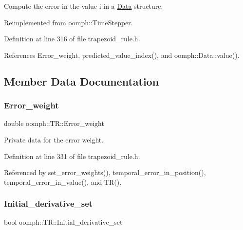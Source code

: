 Compute the error in the value i in a \hyperlink{classoomph_1_1Data}{Data} structure. 



Reimplemented from \hyperlink{classoomph_1_1TimeStepper_a27f66759f6d9b2040d26918adb998c78}{oomph\+::\+Time\+Stepper}.



Definition at line 316 of file trapezoid\+\_\+rule.\+h.



References Error\+\_\+weight, predicted\+\_\+value\+\_\+index(), and oomph\+::\+Data\+::value().



\subsection{Member Data Documentation}
\mbox{\label{classoomph_1_1TR_a5dbcb466fcff21c9780c0cf1b8971bc4}} 
\subsubsection{\texorpdfstring{Error\+\_\+weight}{Error\_weight}}
{\footnotesize\ttfamily double oomph\+::\+T\+R\+::\+Error\+\_\+weight\hspace{0.3cm}{\ttfamily [private]}}



Private data for the error weight. 



Definition at line 331 of file trapezoid\+\_\+rule.\+h.



Referenced by set\+\_\+error\+\_\+weights(), temporal\+\_\+error\+\_\+in\+\_\+position(), temporal\+\_\+error\+\_\+in\+\_\+value(), and T\+R().

\mbox{\label{classoomph_1_1TR_ae665d492f58240c9786f719f6baa2ddf}} 
\subsubsection{\texorpdfstring{Initial\+\_\+derivative\+\_\+set}{Initial\_derivative\_set}}
{\footnotesize\ttfamily bool oomph\+::\+T\+R\+::\+Initial\+\_\+derivative\+\_\+set}



